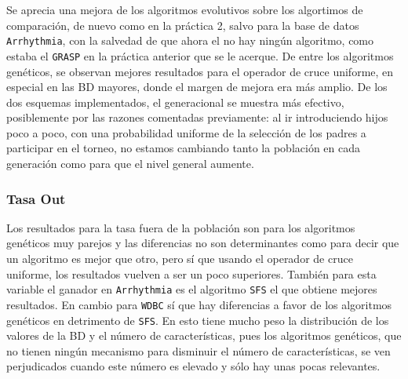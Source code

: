 \documentclass[11pt,leqno]{article}
\begin{document}
	Se aprecia una mejora de los algoritmos evolutivos sobre los algortimos de comparación, de nuevo como en la práctica 2, salvo para la base de datos \texttt{Arrhythmia}, con la salvedad de que ahora el no hay ningún algoritmo,  como estaba el \texttt{GRASP} en la práctica anterior que se le acerque. De entre los algoritmos genéticos, se observan mejores resultados para el operador de cruce uniforme, en especial en las BD mayores, donde el margen de mejora era más amplio. De los dos esquemas implementados, el generacional se muestra más efectivo, posiblemente por las razones comentadas previamente: al ir introduciendo hijos poco a poco, con una probabilidad uniforme de la selección de los padres a participar en el torneo, no estamos cambiando tanto la población en cada generación como para que el nivel general aumente.
 
\subsubsection{Tasa Out}
\begin{center}
\end{center}

Los resultados para la tasa fuera de la población son para los algoritmos genéticos muy parejos y las diferencias no son determinantes como para decir que un algoritmo es mejor que otro, pero sí que usando el operador de cruce uniforme, los resultados vuelven a ser un poco superiores. También para esta variable el ganador en \texttt{Arrhythmia} es el algoritmo \texttt{SFS} el que obtiene mejores resultados. En cambio para \texttt{WDBC} sí que hay diferencias a favor de los algoritmos genéticos en detrimento de \texttt{SFS}. En esto tiene mucho peso la distribución de los valores de la BD y el número de características, pues los algoritmos genéticos, que no tienen ningún mecanismo para disminuir el número de características, se ven perjudicados cuando este número es elevado y sólo hay unas pocas relevantes.
\end{document}
